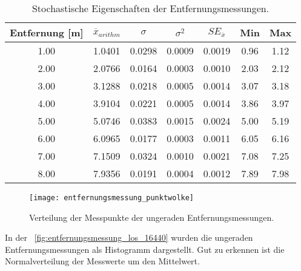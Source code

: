 \begin{table}[h!]
	\centering
	\begin{tabular}{||c||c|c|c|c|c|c||}
		\hline
		Entfernung [\si{\meter}] & $\overline{x}_{arithm}$ & $\sigma$ & $\sigma^2$ & $SE_{\overline{x}}$ & Min & Max\\\hline
		\hline
		\num{1.00} & \num{1.0401} & \num{0.0298} & \num{0.0009} & \num{0.0019} & \num{0.96} & \num{1.12}\\\hline
		\num{2.00} & \num{2.0766} & \num{0.0164} & \num{0.0003} & \num{0.0010} & \num{2.03} & \num{2.12}\\\hline
		\num{3.00} & \num{3.1288} & \num{0.0218} & \num{0.0005} & \num{0.0014} & \num{3.07} & \num{3.18}\\\hline
		\num{4.00} & \num{3.9104} & \num{0.0221} & \num{0.0005} & \num{0.0014} & \num{3.86} & \num{3.97}\\\hline
		\num{5.00} & \num{5.0746} & \num{0.0383} & \num{0.0015} & \num{0.0024} & \num{5.00} & \num{5.19}\\\hline
		\num{6.00} & \num{6.0965} & \num{0.0177} & \num{0.0003} & \num{0.0011} & \num{6.05} & \num{6.16}\\\hline
		\num{7.00} & \num{7.1509} & \num{0.0324} & \num{0.0010} & \num{0.0021} & \num{7.08} & \num{7.25}\\\hline
		\num{8.00} & \num{7.9356} & \num{0.0191} & \num{0.0004} & \num{0.0012} & \num{7.89} & \num{7.98}\\\hline
	\end{tabular}
	\caption{Stochastische Eigenschaften der Entfernungsmessungen.}
	\label{tab:entfernungsmessung_stochastik}
\end{table}

\begin{figure}[h!]
  \centering
  \texttt{[image: entfernungsmessung\_punktwolke]}
	\caption{Verteilung der Messpunkte der ungeraden Entfernungsmessungen.}
	\label{fig:entfernungsmessung_punktwolke}
\end{figure}

In der \figurename~\ref{fig:entfernungsmessung_los_16440} wurden die ungeraden Entfernungsmessungen als Histogramm dargestellt. Gut zu erkennen ist die Normalverteilung der Messwerte um den Mittelwert.

